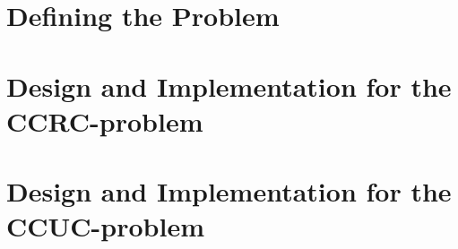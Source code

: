 

\part{Defining the Problem}


\part{Design and Implementation for the CCRC-problem}



\part{Design and Implementation for the CCUC-problem}





